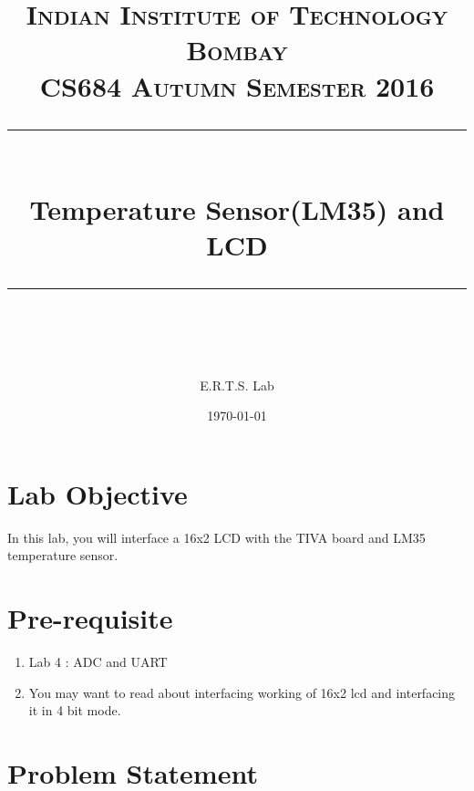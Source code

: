 \documentclass{article} %
\title{
\normalfont \normalsize 
\textsc{Indian Institute of Technology Bombay \\ 
CS684 Autumn Semester 2016} \\
[10pt] 
\rule{\linewidth}{0.5pt} \\[6pt] 
\huge Temperature Sensor(LM35) and LCD\\
\rule{\linewidth}{2pt}  \\[10pt]
}
\author{E.R.T.S. Lab}
\date{\normalsize \today}
\begin{document}
\maketitle
\noindent

\section{Lab Objective}
In this lab, you will interface a 16x2 LCD with the TIVA board and LM35 temperature sensor.

\section{Pre-requisite}
\begin{enumerate}
\item 
Lab 4 : ADC and UART
\item You may want to read about interfacing working of 16x2 lcd and interfacing it in 4 bit mode.

\end{enumerate}


\section{Problem Statement}
\end{document}
